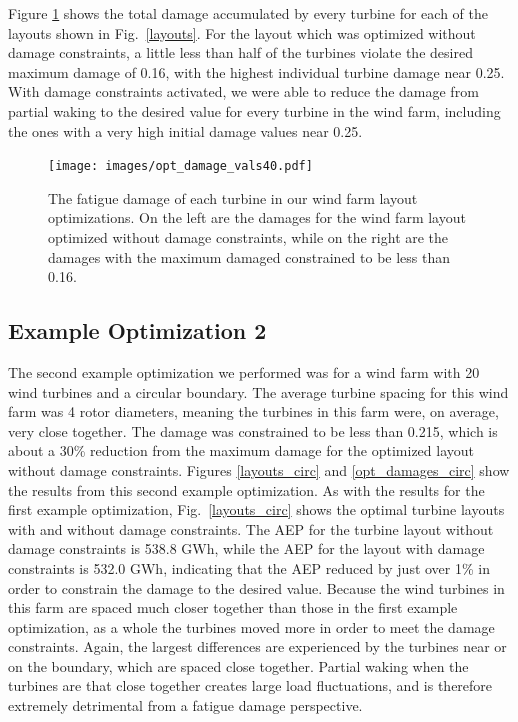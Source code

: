\documentclass[11pt,letterpaper]{article}
\begin{document}
Figure \ref{opt_damages} shows the total damage accumulated by every turbine for each of the layouts shown in Fig.~\ref{layouts}. For the layout which was optimized without damage constraints, a little less than half of the turbines violate the desired maximum damage of 0.16, with the highest individual turbine damage near 0.25. With damage constraints activated, we were able to reduce the damage from partial waking to the desired value for every turbine in the wind farm, including the ones with a very high initial damage values near 0.25.
% 
\begin{figure}
    \centering
    \texttt{[image: images/opt\_damage\_vals40.pdf]}
    \caption{The fatigue damage of each turbine in our wind farm layout optimizations. On the left are the damages for the wind farm layout optimized without damage constraints, while on the right are the damages with the maximum damaged constrained to be less than 0.16.}
    \label{opt_damages}
\end{figure}




\subsection{Example Optimization 2}

The second example optimization we performed was for a wind farm with 20 wind turbines and a circular boundary. The average turbine spacing for this wind farm was 4 rotor diameters, meaning the turbines in this farm were, on average, very close together. The damage was constrained to be less than 0.215, which is about a 30\% reduction from the maximum damage for the optimized layout without damage constraints.
Figures \ref{layouts_circ} and \ref{opt_damages_circ} show the results from this second example optimization. As with the results for the first example optimization, Fig.~\ref{layouts_circ} shows the optimal turbine layouts with and without damage constraints. The AEP for the turbine layout without damage constraints is 538.8 GWh, while the AEP for the layout with damage constraints is 532.0 GWh, indicating that the AEP reduced by just over 1\% in order to constrain the damage to the desired value. 
Because the wind turbines in this farm are spaced much closer together than those in the first example optimization, as a whole the turbines moved more in order to meet the damage constraints. Again, the largest differences are experienced by the turbines near or on the boundary, which are spaced close together. Partial waking when the turbines are that close together creates large load fluctuations, and is therefore extremely detrimental from a fatigue damage perspective.
\end{document}
